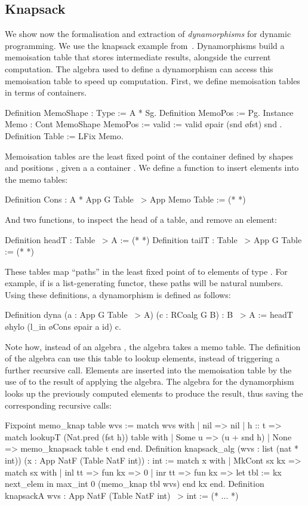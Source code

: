 \documentclass[a4paper,anonymous, UKenglish,cleveref, autoref, thm-restate]{lipics-v2021}
\begin{document}
\subsection{Knapsack}\label{sec:knap}
We show now the formalisation and extraction of \emph{dynamorphisms} for
dynamic programming. We use the
knapsack example from~\cite{HinzeWG15}. Dynamorphisms build a memoisation table
that stores intermediate results, alongside the current computation. The
algebra used to define a dynamorphism can access this memoisation table to
speed up computation.  First, we define memoisation tables in terms of
containers.
\begin{coqcode}
Definition MemoShape : Type := A * Sg.
Definition MemoPos := Pg.
Instance Memo : Cont MemoShape MemoPos := { valid := valid \o pair (snd \o fst) snd }.
Definition Table := LFix Memo.
\end{coqcode}
Memoisation tables are the least fixed point of the container defined by shapes
 and positions , given a a container .
We define a function to insert elements into the memo tables:
\begin{coqcode}
Definition Cons : A * App G Table ~> App Memo Table := (* *)
\end{coqcode}
And two functions, to inspect the head of a table, and remove an
element:
\begin{coqcode}
Definition headT : Table ~> A := (* *)
Definition tailT : Table ~> App G Table := (* *)
\end{coqcode}
These tables map ``paths'' in the least fixed point of  to elements
of type . For example, if  is a list-generating functor, these
paths will be natural numbers. 
Using these definitions, a dynamorphism is defined as follows:
\begin{coqcode}
Definition dyna (a : App G Table ~> A) (c : RCoalg G B) : B ~> A
  := headT \o hylo (l_in \o Cons \o pair a id) c.
\end{coqcode}
Note how, instead of an algebra , the algebra takes a
memo table. The definition of the algebra can use this table to lookup
elements, instead of triggering a further recursive call. Elements are inserted
into the memoisation table by the use of  to the result of applying
the algebra. The algebra for the dynamorphism looks up the previously computed
elements to produce the result, thus saving the corresponding recursive calls:
\begin{coqcode}
Fixpoint memo_knap table wvs :=
  match wvs with | nil => nil | h :: t =>
      match lookupT (Nat.pred (fst h)) table with
      | Some u => (u + snd h)%
      | None => memo_knapsack table t
      end
  end.
Definition knapsack_alg (wvs : list (nat * int))
  (x : App NatF (Table NatF int)) : int :=
  match x with | MkCont sx kx => match sx with
  | inl tt => fun kx => 0%
  | inr tt => fun kx => let tbl := kx next_elem in max_int 0 (memo_knap tbl wvs)
  end kx end.
Definition knapsackA wvs : App NatF (Table NatF int) ~> int :=  (* ... *)
\end{coqcode}
\end{document}
